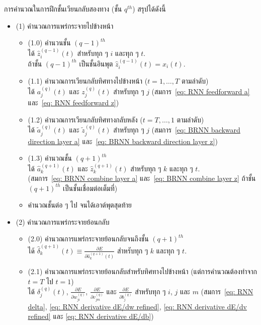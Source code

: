 การคำนวณในการฝึกชั้นเวียนกลับสองทาง (ชั้น $q^{th}$)  สรุปได้ดังนี้
\begin{itemize}
\item (1) คำนวณการแพร่กระจายไปข้างหน้า
	\begin{itemize}	
	\item (1.0) คำนวนชั้น $(q-1)^{th}$ \\
	ได้ $\hat{z}_i^{(q-1)}(t)$
	สำหรับทุก ๆ $i$ และทุก ๆ $t$. \\
	ถ้าชั้น $(q-1)^{th}$ เป็นชั้นอินพุต 
	$\hat{z}_i^{(q-1)}(t) = x_i(t)$.
	
	\item (1.1) คำนวณการเวียนกลับทิศทางไปข้างหน้า ($t = 1, \ldots, T$ ตามลำดับ)\\	
	ได้ $a_j^{(q)}(t)$ 
	และ
	$z_j^{(q)}(t)$ สำหรับทุก ๆ $j$
	(สมการ~\ref{eq: RNN feedforward a}	
	และ~\ref{eq: RNN feedforward z})

	\item (1.2) คำนวณการเวียนกลับทิศทางกลับหลัง ($t = T, \ldots, 1$ ตามลำดับ)\\
	ได้ $\tilde{a}_j^{(q)}(t)$
	และ
	$\tilde{z}_j^{(q)}(t)$ สำหรับทุก ๆ $j$
	(สมการ~\ref{eq: BRNN backward direction layer a}
	และ~\ref{eq: BRNN backward direction layer z})

	\item (1.3) คำนวณชั้น $(q+1)^{th}$ \\		
	ได้ $\hat{a}_k^{(q+1)}(t)$
	และ
	$\hat{z}_k^{(q+1)}(t)$ สำหรับทุก ๆ $k$ และทุก ๆ $t$. \\
	(สมการ~\ref{eq: BRNN combine layer a}
	และ~\ref{eq: BRNN combine layer z} 
	ถ้าชั้น $(q+1)^{th}$ เป็นชั้นเชื่อมต่อเต็มที่)

	\item คำนวณชั้นต่อ ๆ ไป จนได้เอาต์พุตสุดท้าย 		
	\end{itemize}

\item (2) คำนวณการแพร่กระจายย้อนกลับ
	\begin{itemize}
	\item (2.0) คำนวณการแพร่กระจายย้อนกลับจนถึงชั้น $(q+1)^{th}$\\
	ได้ $\hat{\delta}_k^{(q+1)}(t) \equiv \frac{\partial E}{\partial \hat{a}_k^{(q+1)}(t)}$
	สำหรับทุก ๆ $k$ และทุก ๆ $t$.
	
	\item (2.1) คำนวณการแพร่กระจายย้อนกลับสำหรับทิศทางไปข้างหน้า
	(แต่การคำนวณต้องทำจาก $t=T$ ไป $t=1$)\\
	ได้ $\delta_j^{(q)}(t)$,
	$\frac{\partial E}{\partial w_{ji}^{(q)}}$,
	$\frac{\partial E}{\partial v_{jm}^{(q)}}$ และ
	$\frac{\partial E}{\partial b_j^{(q)}}$
	สำหรับทุก ๆ $i$, $j$ และ $m$
	(สมการ~\ref{eq: RNN delta},
	\ref{eq: RNN derivative dE/dw refined},
	\ref{eq: RNN derivative dE/dv refined} และ
	\ref{eq: RNN derivative dE/db})
		

\end{itemize}
\end{itemize}
